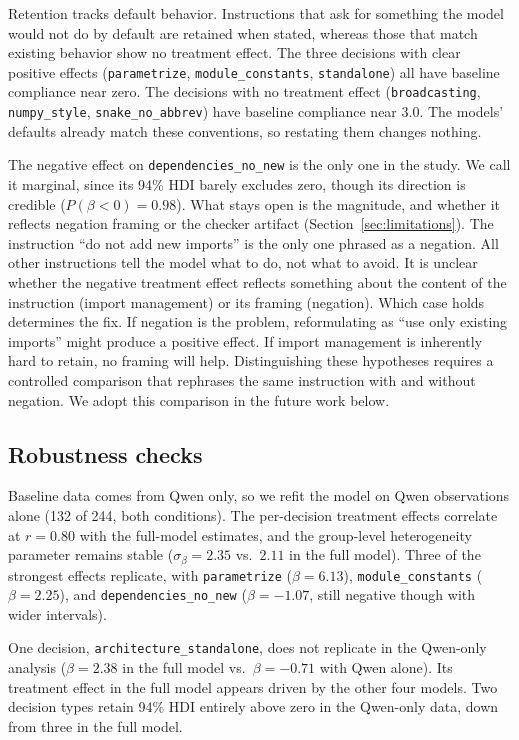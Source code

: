 \documentclass[a4paper]{llncs}
\begin{document}
Retention tracks default behavior. Instructions that ask for something
the model would not do by default are retained when stated, whereas those
that match existing behavior show no treatment effect. The three decisions
with clear positive effects
(\texttt{parametrize}, \texttt{module\_constants},
\texttt{standalone}) all have baseline compliance near zero. The
decisions with no treatment effect (\texttt{broadcasting},
\texttt{numpy\_style}, \texttt{snake\_no\_abbrev}) have baseline
compliance near 3.0. The models' defaults already match these
conventions, so restating them changes nothing.

The negative effect on \texttt{dependencies\_\allowbreak{}no\_new} is the
only one in the study. We call it marginal, since its 94\% HDI barely
excludes zero, though its direction is credible ($P(\beta < 0) = 0.98$). What
stays open is the magnitude, and whether it reflects negation framing or the
checker artifact (Section~\ref{sec:limitations}). The instruction
``do not add new imports'' is the only one phrased as a negation. All
other instructions tell the model what to do, not what to avoid. It is
unclear whether the negative treatment effect reflects
something about the content of the instruction (import management) or
its framing (negation). Which case holds determines the fix. If
negation is the problem, reformulating as ``use only existing imports''
might produce a positive effect. If import management is inherently
hard to retain, no framing will help. Distinguishing these hypotheses
requires a controlled comparison that rephrases the same instruction
with and without negation. We adopt this comparison in the future
work below.

\subsection{Robustness checks}

Baseline data comes from Qwen only, so we refit the model on Qwen
observations alone (132 of 244, both conditions). The per-decision treatment effects correlate at
$r = 0.80$ with the full-model estimates, and the group-level
heterogeneity parameter remains stable ($\sigma_\beta = 2.35$ vs.\
$2.11$ in the full model). Three of the strongest effects replicate, with
\texttt{parametrize} ($\beta = 6.13$), \texttt{module\_constants}
($\beta = 2.25$), and \texttt{dependencies\_no\_new} ($\beta =
-1.07$, still negative though with wider intervals).

One decision, \texttt{architecture\_standalone}, does not replicate in
the Qwen-only analysis ($\beta = 2.38$ in the full model vs.\
$\beta = -0.71$ with Qwen alone). Its treatment effect in the full
model appears driven by the other four models. Two decision types retain 94\% HDI entirely above zero in the Qwen-only
data, down from three in the full model.
\end{document}
